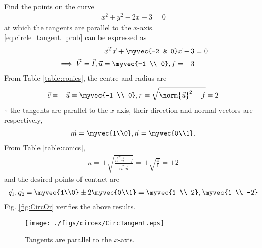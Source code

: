 \item 
Find the points on the curve  
\begin{align}
x^2+y^2-2x-3 = 0
\label{eq:circle_tangent_prob}
\end{align}
at which the tangents are parallel to the $x$-axis.
\\
\solution \eqref{eq:circle_tangent_prob} can be expressed as
\begin{align}
\vec{x}^T\vec{x}+\myvec{-2 & 0}\vec{x}-3 &= 0
\label{eq:circle_tangent_prob_vec}
\\
\implies \vec{V} = \vec{I}, \vec{u} = \myvec{-1 \\ 0}, f = -3
\label{eq:circle_tangent_prob_uf}
\end{align}
From Table \ref{table:conics}, the centre and radius are
\begin{align}
\vec{c} = -\vec{u} = \myvec{-1 \\ 0}, r =\sqrt{\norm{\vec{u}}^2-f} = 2
\end{align}
$\because$ the tangents are parallel to the $x$-axis, their direction and normal vectors are respectively,
\begin{align}
\vec{m} = \myvec{1\\0},
\vec{n} = \myvec{0\\1}.
\end{align}
From Table \ref{table:conics},
\begin{align}
\kappa = \pm \sqrt{\frac{\vec{u}^T\vec{u}-f}{\vec{n}^T\vec{n}}} = \pm \sqrt{\frac{4}{1}} = \pm 2
\end{align}
and the desired points of contact are 
\begin{align}
\vec{q}_1, \vec{q}_2 = \myvec{1\\0}\pm 2\myvec{0\\1} =  
\myvec{1 \\  2},
\myvec{1 \\  -2}
\end{align}
%
Fig. \ref{fig:CircOr}	verifies the above results.
\begin{figure}[!ht]
\centering
\texttt{[image: ./figs/circex/CircTangent.eps]}
\caption{Tangents are parallel to the $x$-axis. }
\label{fig:CircTangent}	
\end{figure}

